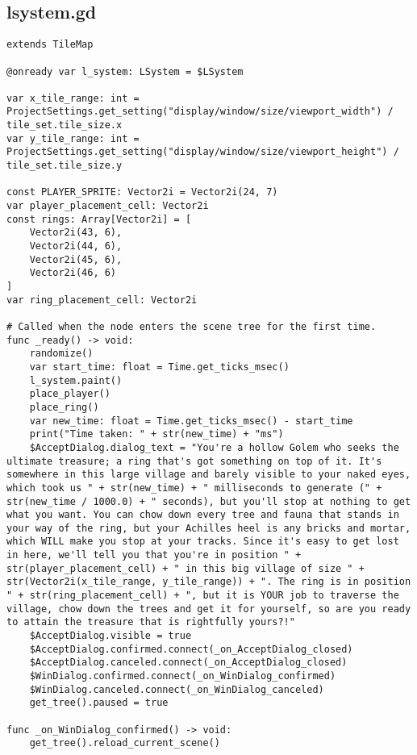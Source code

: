 \subsection{l\textunderscore{}system.gd}

\begin{lstlisting}
extends TileMap

@onready var l_system: LSystem = $LSystem

var x_tile_range: int = ProjectSettings.get_setting("display/window/size/viewport_width") / tile_set.tile_size.x
var y_tile_range: int = ProjectSettings.get_setting("display/window/size/viewport_height") / tile_set.tile_size.y

const PLAYER_SPRITE: Vector2i = Vector2i(24, 7)
var player_placement_cell: Vector2i
const rings: Array[Vector2i] = [
	Vector2i(43, 6),
	Vector2i(44, 6),
	Vector2i(45, 6),
	Vector2i(46, 6)
]
var ring_placement_cell: Vector2i

# Called when the node enters the scene tree for the first time.
func _ready() -> void:
	randomize()
	var start_time: float = Time.get_ticks_msec()
	l_system.paint()
	place_player()
	place_ring()
	var new_time: float = Time.get_ticks_msec() - start_time
	print("Time taken: " + str(new_time) + "ms")
	$AcceptDialog.dialog_text = "You're a hollow Golem who seeks the ultimate treasure; a ring that's got something on top of it. It's somewhere in this large village and barely visible to your naked eyes, which took us " + str(new_time) + " milliseconds to generate (" + str(new_time / 1000.0) + " seconds), but you'll stop at nothing to get what you want. You can chow down every tree and fauna that stands in your way of the ring, but your Achilles heel is any bricks and mortar, which WILL make you stop at your tracks. Since it's easy to get lost in here, we'll tell you that you're in position " + str(player_placement_cell) + " in this big village of size " + str(Vector2i(x_tile_range, y_tile_range)) + ". The ring is in position " + str(ring_placement_cell) + ", but it is YOUR job to traverse the village, chow down the trees and get it for yourself, so are you ready to attain the treasure that is rightfully yours?!"
	$AcceptDialog.visible = true
	$AcceptDialog.confirmed.connect(_on_AcceptDialog_closed)
	$AcceptDialog.canceled.connect(_on_AcceptDialog_closed)
	$WinDialog.confirmed.connect(_on_WinDialog_confirmed)
	$WinDialog.canceled.connect(_on_WinDialog_canceled)
	get_tree().paused = true

func _on_WinDialog_confirmed() -> void:
	get_tree().reload_current_scene()


\end{lstlisting}
